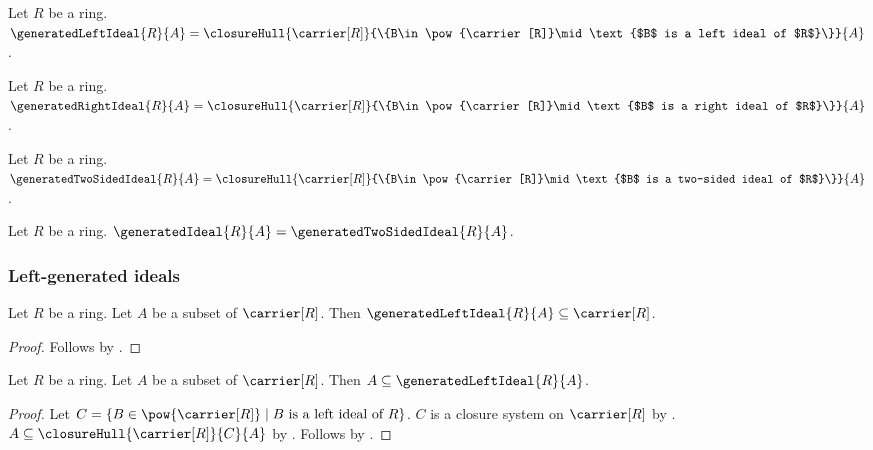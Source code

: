 \begin{definition}\label{generated_left_ideal}
    Let $R$ be a ring.
    $\generatedLeftIdeal{R}{A}=
        \closureHull{\carrier[R]}
            {\{B\in\pow{\carrier[R]}\mid
                \text{$B$ is a left ideal of $R$}\}}
            {A}$.
\end{definition}

\begin{definition}\label{generated_right_ideal}
    Let $R$ be a ring.
    $\generatedRightIdeal{R}{A}=
        \closureHull{\carrier[R]}
            {\{B\in\pow{\carrier[R]}\mid
                \text{$B$ is a right ideal of $R$}\}}
            {A}$.
\end{definition}

\begin{definition}\label{generated_two_sided_ideal}
    Let $R$ be a ring.
    $\generatedTwoSidedIdeal{R}{A}=
        \closureHull{\carrier[R]}
            {\{B\in\pow{\carrier[R]}\mid
                \text{$B$ is a two-sided ideal of $R$}\}}
            {A}$.
\end{definition}

\begin{definition}\label{generated_ideal}
    Let $R$ be a ring.
    $\generatedIdeal{R}{A}=\generatedTwoSidedIdeal{R}{A}$.
\end{definition}

\subsubsection{Left-generated ideals}

\begin{proposition}\label{generated_left_ideal_subseteq_carrier}
    Let $R$ be a ring.
    Let $A$ be a subset of $\carrier[R]$.
    Then $\generatedLeftIdeal{R}{A}\subseteq\carrier[R]$.
\end{proposition}
\begin{proof}
    Follows by .
\end{proof}

\begin{proposition}\label{generated_left_ideal_contains_generators}
    Let $R$ be a ring.
    Let $A$ be a subset of $\carrier[R]$.
    Then $A\subseteq\generatedLeftIdeal{R}{A}$.
\end{proposition}
\begin{proof}
    Let
        $C=\{B\in\pow{\carrier[R]}\mid
            \text{$B$ is a left ideal of $R$}\}$.
    $C$ is a closure system on $\carrier[R]$ by
        .
    $A\subseteq\closureHull{\carrier[R]}{C}{A}$ by
        .
    Follows by .
\end{proof}

